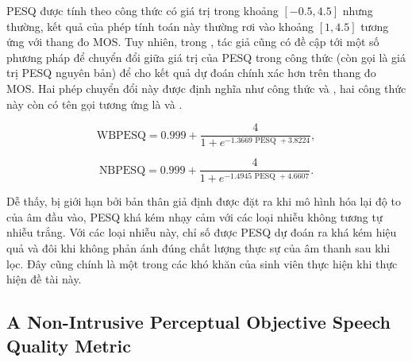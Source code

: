 		
		PESQ được tính theo công thức  có giá trị trong khoảng $[-0.5, 4.5]$ nhưng thường, kết quả của phép tính toán này thường rơi vào khoảng $[1, 4.5]$ tương ứng với thang đo MOS. Tuy nhiên, trong \cite{speech_enhancement}, tác giả cũng có đề cập tới một số phương pháp để chuyển đổi giữa giá trị của PESQ trong công thức  (còn gọi là giá trị PESQ nguyên bản) để cho kết quả dự đoán chính xác hơn trên thang đo MOS. Hai phép chuyển đổi này được định nghĩa như công thức  và , hai công thức này còn có tên gọi tương ứng là  \cite{itu_p862.2} và  \cite{itu_p862.1}.
		
			\begin{equation}
				\text{WBPESQ} = 0.999 + \frac{4}{1 + e^{-1.3669 \text{ PESQ } + 3.8224}},
			\label{sound::wbpesq}
			\end{equation}
		
			\begin{equation}
				\text{NBPESQ} = 0.999 + \frac{4}{1 + e^{-1.4945 \text{ PESQ } + 4.6607}}.
			\label{sound::nbpesq}
			\end{equation}
		
		Dễ thấy, bị giới hạn bởi bản thân giả định được đặt ra khi mô hình hóa lại độ to của âm đầu vào, PESQ khá kém nhạy cảm với các loại nhiễu không tương tự nhiễu trắng. Với các loại nhiễu này, chỉ số được PESQ dự đoán ra khá kém hiệu quả và đôi khi không phản ánh đúng chất lượng thực sự của âm thanh sau khi lọc. Đây cũng chính là một trong các khó khăn của sinh viên thực hiện khi thực hiện đề tài này.
	
	\subsection{A Non-Intrusive Perceptual Objective Speech Quality Metric}
	
		
